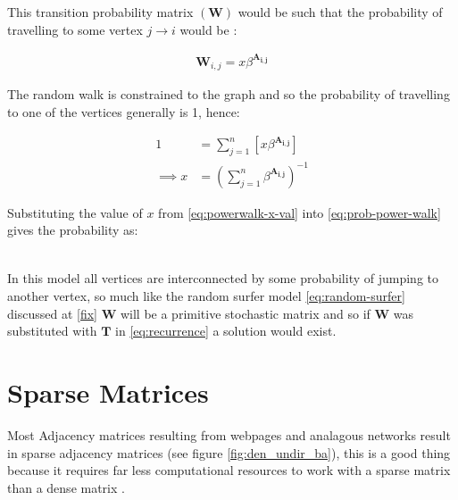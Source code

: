 \documentclass[11pt]{report}
\begin{document}
This transition probability matrix \(\left( \mathbf{W}\right)\) would be such that the probability of
travelling to some vertex \(j \rightarrow i\) would be \cite{parkPowerWalkRevisiting2013}:

\begin{align}
\mathbf{W}_{i, j} = x\beta^{\mathbf{A_{i,j}}} \label{eq:prob-power-walk}
\end{align}

The random walk is constrained to the graph and so the probability of travelling
to one of the vertices generally is 1, hence:


\begin{align}
      1 &= \sum^{n}_{j= 1}   \left[ x \beta^{\mathbf{A_{i,j}}} \right] \\
       \implies  x&= \left( \sum^{n}_{j= 1}   \beta^{\mathbf{A_{i,j}}}
       \right)^{-1} \label{eq:powerwalk-x-val}
\end{align}

Substituting the value of \(x\) from \eqref{eq:powerwalk-x-val} into \eqref{eq:prob-power-walk} gives the probability as:

\begin{align}
\end{align}

In this model all vertices are interconnected by some probability of jumping to
another vertex, so much like the random surfer model \eqref{eq:random-surfer} discussed
at \ref{fix} \(\mathbf{W}\) will be a primitive stochastic matrix and so if
\(\mathbf{W}\) was substituted with \(\mathbf{T}\) in \eqref{eq:recurrence} a solution
would exist.

\section{Sparse Matrices}
\label{sparse-matrix}
Most Adjacency matrices resulting from webpages and analagous networks
result in sparse adjacency matrices (see figure \ref{fig:den_undir_ba}),
this is a good thing because it requires far less computational
resources to work with a sparse matrix than a dense matrix
 \cite[]{langvilleGooglePageRankScience2012} .
\end{document}
